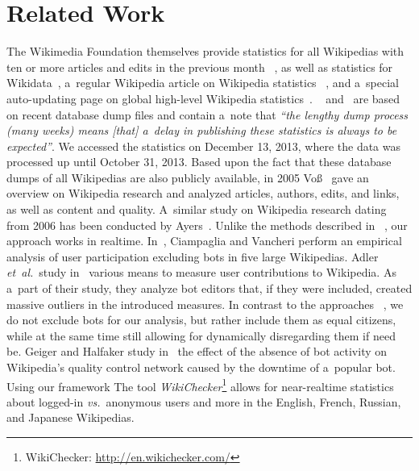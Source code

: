 \documentclass{sig-alternate}
\newcommand{\inlinelistingsize}{\fontsize{8pt}{11pt}}
\let\oldurl\url
\renewcommand{\url}[1]{\inlinelistingsize\oldurl{#1}}
\begin{document}
\section{Related Work}

The Wikimedia Foundation themselves provide
statistics for all Wikipedias
with ten or more articles and edits in the previous month%
~\cite{zachte2013wikipedia},
as well as statistics for Wikidata~\cite{zachte2013wikidata},
a~regular Wikipedia article on Wikipedia statistics%
~\cite{wikipedia2013stats},
and a~special auto-updating page on global high-level
Wikipedia statistics~\cite{wikipedia2013special}.
~\cite{zachte2013wikidata} and~\cite{zachte2013wikipedia}
are based on recent database dump files
and contain a~note that \textit{``the lengthy dump process
(many weeks) means [that] a~delay in publishing these statistics
is always to be expected''}.
We accessed the statistics on December 13, 2013,
where the data was processed up until October 31, 2013.
Based upon the fact that these database dumps
of all Wikipedias are also publicly available,
in 2005 Voß~\cite{voss2005measuring} gave 
an overview on Wikipedia research
and analyzed articles, authors, edits, and links,
as well as content and quality.
A~similar study on Wikipedia research dating from 2006
has been conducted by Ayers~\cite{ayers2006researchingwikipedia}.
Unlike the methods described in~%
\cite{ayers2006researchingwikipedia,voss2005measuring,zachte2013wikidata,zachte2013wikipedia},
our approach works in realtime.
In~\cite{ciampaglia2010empiricalanalysis}, Ciampaglia and Vancheri
perform an empirical analysis of user participation
excluding bots in five large Wikipedias.
Adler \emph{et~al.}\ study in~\cite{adler2008measuringauthor}
various means to measure user contributions to Wikipedia.
As a~part of their study, they analyze bot editors
that, if they were included, created massive outliers
in the introduced measures.
In contrast to the approaches%
~\cite{adler2008measuringauthor,ciampaglia2010empiricalanalysis},
we do not exclude bots for our analysis,
but rather include them as equal citizens,
while at the same time still allowing for dynamically
disregarding them if need be.
Geiger and Halfaker study in~\cite{geiger2013withoutbots}
the effect of the absence of bot activity on Wikipedia's
quality control network caused by the downtime of a~popular bot.
Using our framework
The tool \emph{WikiChecker}\footnote{WikiChecker:
\url{http://en.wikichecker.com/}}
allows for near-realtime statistics
about logged-in \emph{vs.}\ anonymous users and more in
the English, French, Russian, and Japanese Wikipedias.
\end{document}
